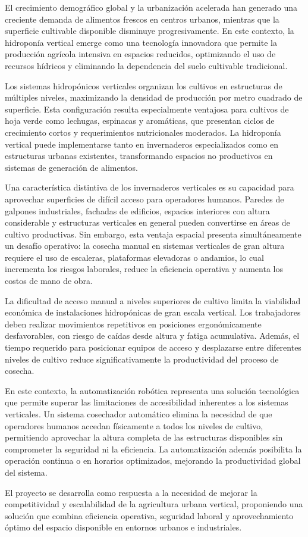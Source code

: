 
El crecimiento demográfico global y la urbanización acelerada han generado una creciente demanda de alimentos frescos en centros urbanos, mientras que la superficie cultivable disponible disminuye progresivamente. En este contexto, la hidroponía vertical emerge como una tecnología innovadora que permite la producción agrícola intensiva en espacios reducidos, optimizando el uso de recursos hídricos y eliminando la dependencia del suelo cultivable tradicional.

Los sistemas hidropónicos verticales organizan los cultivos en estructuras de múltiples niveles, maximizando la densidad de producción por metro cuadrado de superficie. Esta configuración resulta especialmente ventajosa para cultivos de hoja verde como lechugas, espinacas y aromáticas, que presentan ciclos de crecimiento cortos y requerimientos nutricionales moderados. La hidroponía vertical puede implementarse tanto en invernaderos especializados como en estructuras urbanas existentes, transformando espacios no productivos en sistemas de generación de alimentos.

Una característica distintiva de los invernaderos verticales es su capacidad para aprovechar superficies de difícil acceso para operadores humanos. Paredes de galpones industriales, fachadas de edificios, espacios interiores con altura considerable y estructuras verticales en general pueden convertirse en áreas de cultivo productivas. Sin embargo, esta ventaja espacial presenta simultáneamente un desafío operativo: la cosecha manual en sistemas verticales de gran altura requiere el uso de escaleras, plataformas elevadoras o andamios, lo cual incrementa los riesgos laborales, reduce la eficiencia operativa y aumenta los costos de mano de obra.

La dificultad de acceso manual a niveles superiores de cultivo limita la viabilidad económica de instalaciones hidropónicas de gran escala vertical. Los trabajadores deben realizar movimientos repetitivos en posiciones ergonómicamente desfavorables, con riesgo de caídas desde altura y fatiga acumulativa. Además, el tiempo requerido para posicionar equipos de acceso y desplazarse entre diferentes niveles de cultivo reduce significativamente la productividad del proceso de cosecha.

En este contexto, la automatización robótica representa una solución tecnológica que permite superar las limitaciones de accesibilidad inherentes a los sistemas verticales. Un sistema cosechador automático elimina la necesidad de que operadores humanos accedan físicamente a todos los niveles de cultivo, permitiendo aprovechar la altura completa de las estructuras disponibles sin comprometer la seguridad ni la eficiencia. La automatización además posibilita la operación continua o en horarios optimizados, mejorando la productividad global del sistema.

El proyecto se desarrolla como respuesta a la necesidad de mejorar la competitividad y escalabilidad de la agricultura urbana vertical, proponiendo una solución que combina eficiencia operativa, seguridad laboral y aprovechamiento óptimo del espacio disponible en entornos urbanos e industriales.
